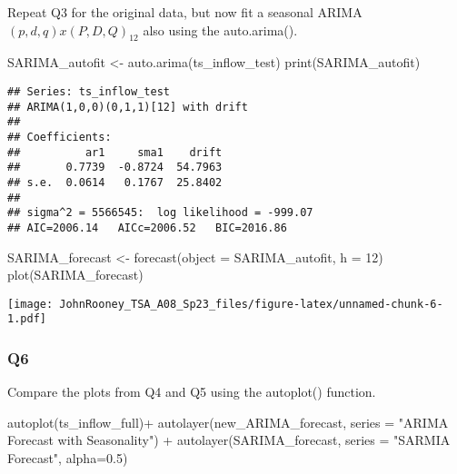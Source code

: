 \documentclass[
]{article}
\newenvironment{Shaded}{\begin{snugshade}}{\end{snugshade}}
\newcommand{\AttributeTok}[1]{\textcolor[rgb]{0.77,0.63,0.00}{#1}}
\newcommand{\DecValTok}[1]{\textcolor[rgb]{0.00,0.00,0.81}{#1}}
\newcommand{\FloatTok}[1]{\textcolor[rgb]{0.00,0.00,0.81}{#1}}
\newcommand{\FunctionTok}[1]{\textcolor[rgb]{0.00,0.00,0.00}{#1}}
\newcommand{\NormalTok}[1]{#1}
\newcommand{\OtherTok}[1]{\textcolor[rgb]{0.56,0.35,0.01}{#1}}
\newcommand{\SpecialCharTok}[1]{\textcolor[rgb]{0.00,0.00,0.00}{#1}}
\newcommand{\StringTok}[1]{\textcolor[rgb]{0.31,0.60,0.02}{#1}}
\begin{document}
Repeat Q3 for the original data, but now fit a seasonal
ARIMA\((p,d,q)x(P,D,Q)_ {12}\) also using the auto.arima().

\begin{Shaded}
\begin{Highlighting}[]
\NormalTok{SARIMA\_autofit }\OtherTok{\textless{}{-}} \FunctionTok{auto.arima}\NormalTok{(ts\_inflow\_test)}
\FunctionTok{print}\NormalTok{(SARIMA\_autofit)}
\end{Highlighting}
\end{Shaded}

\begin{verbatim}
## Series: ts_inflow_test 
## ARIMA(1,0,0)(0,1,1)[12] with drift 
## 
## Coefficients:
##          ar1     sma1    drift
##       0.7739  -0.8724  54.7963
## s.e.  0.0614   0.1767  25.8402
## 
## sigma^2 = 5566545:  log likelihood = -999.07
## AIC=2006.14   AICc=2006.52   BIC=2016.86
\end{verbatim}

\begin{Shaded}
\begin{Highlighting}[]
\NormalTok{SARIMA\_forecast }\OtherTok{\textless{}{-}} \FunctionTok{forecast}\NormalTok{(}\AttributeTok{object =}\NormalTok{ SARIMA\_autofit, }\AttributeTok{h =} \DecValTok{12}\NormalTok{)}
\FunctionTok{plot}\NormalTok{(SARIMA\_forecast)}
\end{Highlighting}
\end{Shaded}

\texttt{[image: JohnRooney\_TSA\_A08\_Sp23\_files/figure-latex/unnamed-chunk-6-1.pdf]}

\hypertarget{q6}{%
\subsubsection{Q6}\label{q6}}

Compare the plots from Q4 and Q5 using the autoplot() function.

\begin{Shaded}
\begin{Highlighting}[]
\FunctionTok{autoplot}\NormalTok{(ts\_inflow\_full)}\SpecialCharTok{+}
  \FunctionTok{autolayer}\NormalTok{(new\_ARIMA\_forecast, }\AttributeTok{series =} \StringTok{"ARIMA Forecast with Seasonality"}\NormalTok{) }\SpecialCharTok{+}
  \FunctionTok{autolayer}\NormalTok{(SARIMA\_forecast, }\AttributeTok{series =} \StringTok{"SARMIA Forecast"}\NormalTok{, }\AttributeTok{alpha=}\FloatTok{0.5}\NormalTok{)}
\end{Highlighting}
\end{Shaded}
\end{document}
